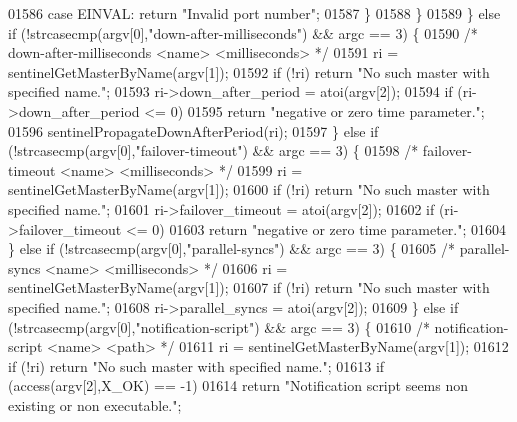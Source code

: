 \begin{DoxyCode}
{{{{{{{{{{{{{{{{{{01586             \textcolor{keywordflow}{case} EINVAL: \textcolor{keywordflow}{return} \textcolor{stringliteral}{"Invalid port number"};
01587             \}
01588         \}
01589     \} \textcolor{keywordflow}{else} \textcolor{keywordflow}{if} (!strcasecmp(argv[0],\textcolor{stringliteral}{"down-after-milliseconds"}) && argc == 3) \{
01590         \textcolor{comment}{/* down-after-milliseconds <name> <milliseconds> */}
01591         ri = sentinelGetMasterByName(argv[1]);
01592         \textcolor{keywordflow}{if} (!ri) \textcolor{keywordflow}{return} \textcolor{stringliteral}{"No such master with specified name."};
01593         ri->down\_after\_period = atoi(argv[2]);
01594         \textcolor{keywordflow}{if} (ri->down\_after\_period <= 0)
01595             \textcolor{keywordflow}{return} \textcolor{stringliteral}{"negative or zero time parameter."};
01596         sentinelPropagateDownAfterPeriod(ri);
01597     \} \textcolor{keywordflow}{else} \textcolor{keywordflow}{if} (!strcasecmp(argv[0],\textcolor{stringliteral}{"failover-timeout"}) && argc == 3) \{
01598         \textcolor{comment}{/* failover-timeout <name> <milliseconds> */}
01599         ri = sentinelGetMasterByName(argv[1]);
01600         \textcolor{keywordflow}{if} (!ri) \textcolor{keywordflow}{return} \textcolor{stringliteral}{"No such master with specified name."};
01601         ri->failover\_timeout = atoi(argv[2]);
01602         \textcolor{keywordflow}{if} (ri->failover\_timeout <= 0)
01603             \textcolor{keywordflow}{return} \textcolor{stringliteral}{"negative or zero time parameter."};
01604    \} \textcolor{keywordflow}{else} \textcolor{keywordflow}{if} (!strcasecmp(argv[0],\textcolor{stringliteral}{"parallel-syncs"}) && argc == 3) \{
01605         \textcolor{comment}{/* parallel-syncs <name> <milliseconds> */}
01606         ri = sentinelGetMasterByName(argv[1]);
01607         \textcolor{keywordflow}{if} (!ri) \textcolor{keywordflow}{return} \textcolor{stringliteral}{"No such master with specified name."};
01608         ri->parallel\_syncs = atoi(argv[2]);
01609    \} \textcolor{keywordflow}{else} \textcolor{keywordflow}{if} (!strcasecmp(argv[0],\textcolor{stringliteral}{"notification-script"}) && argc == 3) \{
01610         \textcolor{comment}{/* notification-script <name> <path> */}
01611         ri = sentinelGetMasterByName(argv[1]);
01612         \textcolor{keywordflow}{if} (!ri) \textcolor{keywordflow}{return} \textcolor{stringliteral}{"No such master with specified name."};
01613         \textcolor{keywordflow}{if} (access(argv[2],X\_OK) == -1)
01614             \textcolor{keywordflow}{return} \textcolor{stringliteral}{"Notification script seems non existing or non executable."};
}}}}}}}}}}}}}}}}}}
\end{DoxyCode}
